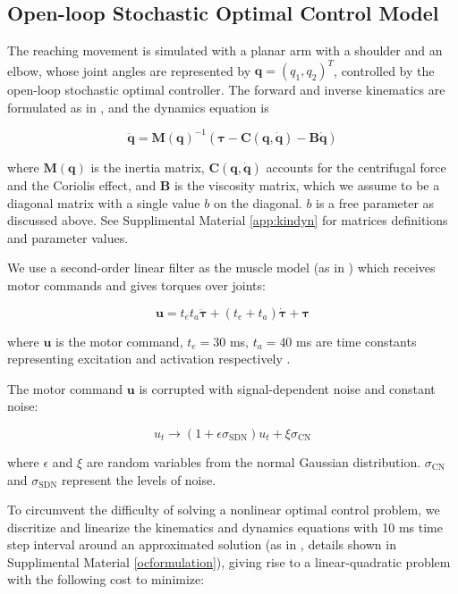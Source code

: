 \subsection{Open-loop Stochastic Optimal Control Model}
The reaching movement is simulated with a planar arm with a shoulder and an elbow, whose joint angles are represented by $\bm{q} = (q_1, q_2)^T$, controlled by the open-loop stochastic optimal controller. 
The forward and inverse kinematics are formulated as in \cite{VanBeers2004}, and the dynamics equation is

\begin{equation} \label{maindynamics}
	\ddot{\bm{q}} = \bm{M}(\bm{q})^{-1} (\bm{\tau} - \bm{C}(\bm{q}, \dot{\bm{q}}) - \bm{B}\dot{\bm{q}})
\end{equation}

where $\bm{M}(\bm{q})$ is the inertia matrix, $\bm{C}(\bm{q}, \dot{\bm{q}})$ accounts for the centrifugal force and the Coriolis effect, and $\bm{B}$ is the viscosity matrix, which we assume to be a diagonal matrix with a single value $b$ on the diagonal. $b$ is a free parameter as discussed above. 
See Supplimental Material \ref{app:kindyn} for matrices definitions and parameter values.

We use a second-order linear filter as the muscle model (as in \cite{VanBeers2004}) which receives motor commands and gives torques over joints:

\begin{equation}
	\bm{u} = t_et_a\ddot{\bm{\tau}} + (t_e+t_a)\dot{\bm{\tau}} +\bm{\tau}
\end{equation}

where $\bm{u}$ is the motor command, $t_e = 30$ ms, $t_a = 40$ ms are time constants representing excitation and activation respectively \cite{VanDerHelm}. 

The motor command $\bm{u}$ is corrupted with signal-dependent noise and constant noise:

\begin{equation}\label{cnsdn}
u_t \rightarrow (1 + \epsilon\sigma_{\text{SDN}}) u_t + \xi\sigma_{\text{CN}}
\end{equation}

where $\epsilon$ and $\xi$ are random variables from the normal Gaussian distribution.
$\sigma_{\text{CN}}$ and $\sigma_{\text{SDN}}$ represent the levels of noise.

To circumvent the difficulty of solving a nonlinear optimal control problem, we discritize and linearize the kinematics and dynamics equations with 10 ms time step interval around an approximated solution (as in \cite{Li2004}, details shown in Supplimental Material \ref{ocformulation}), giving rise to a linear-quadratic problem with the following cost to minimize:

